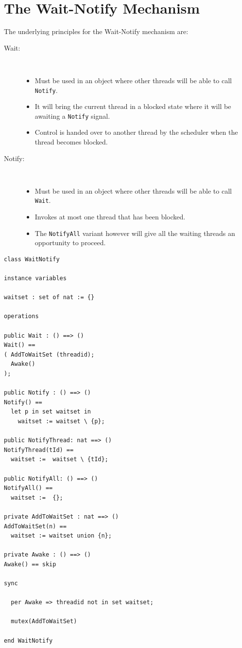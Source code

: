 \documentclass{overturerepchap}
\begin{document}
\section{The Wait-Notify Mechanism} \label{app:waitnotify}

The underlying principles for the Wait-Notify mechanism are:

\begin{description}
\item[Wait:]\mbox{}\\
            \begin{itemize}
            \item Must be used in an object where other threads will be
                  able to call \texttt{Notify}.
            \item It will bring the current thread in a blocked state 
                  where it will be awaiting a \texttt{Notify} signal.
            \item Control is handed over to another thread by the scheduler
                  when the thread becomes blocked.
            \end{itemize}
\item[Notify:]\mbox{}\\
  \begin{itemize}
  \item Must be used in an object where other threads will be
        able to call \texttt{Wait}.
  \item Invokes at most one thread that has been blocked.
  \item The \texttt{NotifyAll} variant however will give all the
        waiting threads an opportunity to proceed.
  \end{itemize}
\end{description}

\begin{lstlisting}
class WaitNotify

instance variables

waitset : set of nat := {}

operations

public Wait : () ==> ()
Wait() ==
( AddToWaitSet (threadid);
  Awake()
);

public Notify : () ==> ()
Notify() ==
  let p in set waitset in
    waitset := waitset \ {p};

public NotifyThread: nat ==> ()
NotifyThread(tId) ==
  waitset :=  waitset \ {tId};

public NotifyAll: () ==> ()
NotifyAll() ==
  waitset :=  {};

private AddToWaitSet : nat ==> ()
AddToWaitSet(n) ==
  waitset := waitset union {n};

private Awake : () ==> ()
Awake() == skip

sync

  per Awake => threadid not in set waitset;

  mutex(AddToWaitSet)

end WaitNotify
\end{lstlisting}
\end{document}
